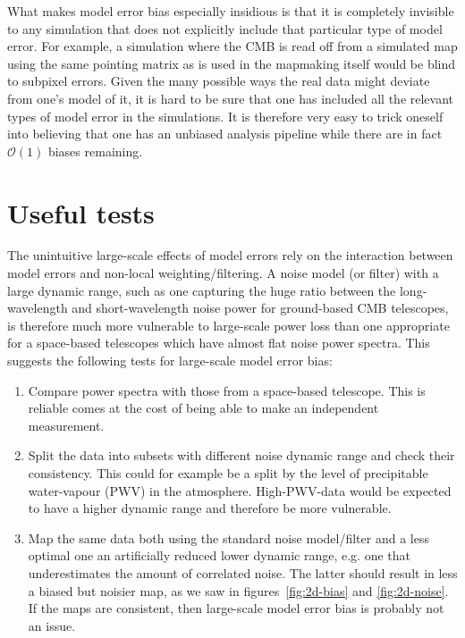 \documentclass[twocolumn,apj]{aastex63}
\begin{document}
What makes model error bias especially insidious is that
it is completely invisible to any simulation that does not explicitly include
that particular type of model error. For example, a simulation where the CMB
is read off from a simulated map using the same pointing matrix as is used
in the mapmaking itself would be blind to subpixel errors. Given the many
possible ways the real data might deviate from one's model of it, it is hard
to be sure that one has included all the relevant types of model error in the simulations.
It is therefore very easy to trick oneself into believing that one has an
unbiased analysis pipeline while there are in fact $\mathcal{O}(1)$ biases remaining.

\section{Useful tests}
The unintuitive large-scale effects of model errors rely on the interaction
between model errors and non-local weighting/filtering. A noise model (or filter) with
a large dynamic range, such as one capturing the huge ratio between the long-wavelength
and short-wavelength noise power for ground-based CMB telescopes, is therefore
much more vulnerable to large-scale power loss than one appropriate for a
space-based telescopes which have almost flat noise power spectra. This suggests
the following tests for large-scale model error bias:
\begin{enumerate}
	\item Compare power spectra with those from a space-based telescope.
		This is reliable comes at the cost of being able to make an independent measurement.
	\item Split the data into subsets with different noise dynamic range
		and check their consistency. This could for example be a split by the
		level of precipitable water-vapour (PWV) in the atmosphere. High-PWV-data
		would be expected to have a higher dynamic range and therefore be more vulnerable.
	\item Map the same data both using the standard noise model/filter and a
		less optimal one an artificially reduced lower dynamic range, e.g. one that
		underestimates the amount of correlated noise. The latter should result in
		less a biased but noisier map, as we saw in figures~\ref{fig:2d-bias} and \ref{fig:2d-noise}.
		If the maps are consistent, then large-scale model error bias is probably not an issue.
\end{enumerate}
\end{document}
